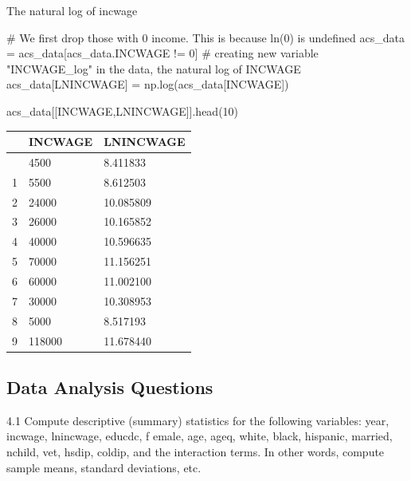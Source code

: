 \documentclass[
  11pt,
  letterpaper,
  DIV=11,
  numbers=noendperiod]{scrartcl}
\newenvironment{Shaded}{\begin{snugshade}}{\end{snugshade}}
\newcommand{\CommentTok}[1]{\textcolor[rgb]{0.37,0.37,0.37}{#1}}
\newcommand{\DecValTok}[1]{\textcolor[rgb]{0.68,0.00,0.00}{#1}}
\newcommand{\NormalTok}[1]{\textcolor[rgb]{0.00,0.23,0.31}{#1}}
\newcommand{\OperatorTok}[1]{\textcolor[rgb]{0.37,0.37,0.37}{#1}}
\newcommand{\StringTok}[1]{\textcolor[rgb]{0.13,0.47,0.30}{#1}}
\begin{document}
The natural log of incwage

\begin{Shaded}
\begin{Highlighting}[]
\CommentTok{\# We first drop those with 0 income. This is because ln(0) is undefined}
\NormalTok{acs\_data }\OperatorTok{=}\NormalTok{ acs\_data[acs\_data.INCWAGE }\OperatorTok{!=} \DecValTok{0}\NormalTok{]}
\CommentTok{\# creating new variable "INCWAGE\_log" in the data, the natural log of INCWAGE }
\NormalTok{acs\_data[}\StringTok{\textquotesingle{}LNINCWAGE\textquotesingle{}}\NormalTok{] }\OperatorTok{=}\NormalTok{ np.log(acs\_data[}\StringTok{\textquotesingle{}INCWAGE\textquotesingle{}}\NormalTok{])}
\end{Highlighting}
\end{Shaded}

\begin{Shaded}
\begin{Highlighting}[]
\NormalTok{acs\_data[[}\StringTok{\textquotesingle{}INCWAGE\textquotesingle{}}\NormalTok{,}\StringTok{\textquotesingle{}LNINCWAGE\textquotesingle{}}\NormalTok{]].head(}\DecValTok{10}\NormalTok{)}
\end{Highlighting}
\end{Shaded}

\begin{longtable}[]{@{}lll@{}}
\toprule\noalign{}
& INCWAGE & LNINCWAGE \\
\midrule\noalign{}
\endhead
\bottomrule\noalign{}
\endlastfoot
0 & 4500 & 8.411833 \\
1 & 5500 & 8.612503 \\
2 & 24000 & 10.085809 \\
3 & 26000 & 10.165852 \\
4 & 40000 & 10.596635 \\
5 & 70000 & 11.156251 \\
6 & 60000 & 11.002100 \\
7 & 30000 & 10.308953 \\
8 & 5000 & 8.517193 \\
9 & 118000 & 11.678440 \\
\end{longtable}

\subsection{Data Analysis Questions}\label{data-analysis-questions}

4.1 Compute descriptive (summary) statistics for the following
variables: year, incwage, lnincwage, educdc, f emale, age, ageq, white,
black, hispanic, married, nchild, vet, hsdip, coldip, and the
interaction terms. In other words, compute sample means, standard
deviations, etc.
\end{document}
